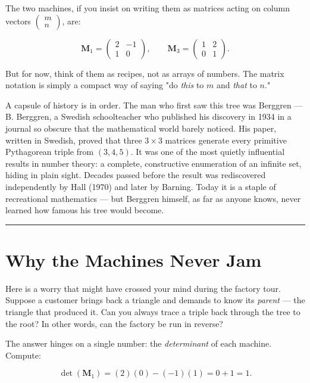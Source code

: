 \documentclass[12pt, letterpaper, openany]{book}
\theoremstyle{definition}
\theoremstyle{remark}
\begin{document}
The two machines, if you insist on writing them as matrices acting on column vectors $\begin{pmatrix} m \\ n \end{pmatrix}$, are:

\[
\mathbf{M}_1 = \begin{pmatrix} 2 & -1 \\ 1 & 0 \end{pmatrix}, \qquad
\mathbf{M}_3 = \begin{pmatrix} 1 & 2 \\ 0 & 1 \end{pmatrix}.
\]

But for now, think of them as recipes, not as arrays of numbers. The matrix notation is simply a compact way of saying "do \textit{this} to $m$ and \textit{that} to $n$."

A capsule of history is in order. The man who first saw this tree was Berggren --- B. Berggren, a Swedish schoolteacher who published his discovery in 1934 in a journal so obscure that the mathematical world barely noticed. His paper, written in Swedish, proved that three $3 \times 3$ matrices generate every primitive Pythagorean triple from $(3, 4, 5)$. It was one of the most quietly influential results in number theory: a complete, constructive enumeration of an infinite set, hiding in plain sight. Decades passed before the result was rediscovered independently by Hall (1970) and later by Barning. Today it is a staple of recreational mathematics --- but Berggren himself, as far as anyone knows, never learned how famous his tree would become.


\bigskip\noindent\rule{\textwidth}{0.4pt}\bigskip



\section*{Why the Machines Never Jam}


Here is a worry that might have crossed your mind during the factory tour. Suppose a customer brings back a triangle and demands to know its \textit{parent} --- the triangle that produced it. Can you always trace a triple back through the tree to the root? In other words, can the factory be run in reverse?

The answer hinges on a single number: the \textit{determinant} of each machine. Compute:

\[
\det(\mathbf{M}_1) = (2)(0) - (-1)(1) = 0 + 1 = 1.
\]
\end{document}

